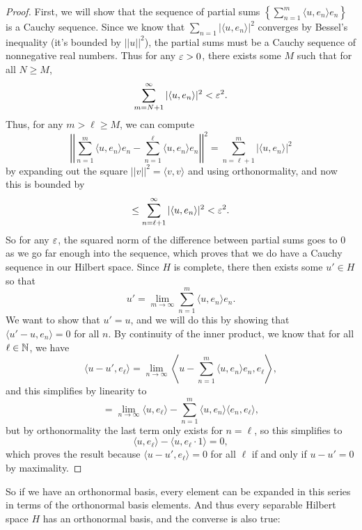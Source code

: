 \begin{proof}
First, we will show that the sequence of partial sums $\left\{\sum_{n=1}^m \langle u, e_n \rangle e_n\right\}$ is a Cauchy sequence. Since we know that $\sum_{n=1} |\langle u, e_n \rangle|^2$ converges by Bessel's inequality (it's bounded by $||u||^2$), the partial sums must be a Cauchy sequence of nonnegative real numbers. Thus for any $\varepsilon > 0$, there exists some $M$ such that for all $N \ge M$, 
\[
    \sum_{m = N+1}^{\infty} |\langle u, e_n \rangle|^2 < \varepsilon^2.
\]
Thus, for any $m > \ell \ge M$, we can compute 
\[
    \left|\left|\sum_{n=1}^m \langle u, e_n \rangle e_n - \sum_{n=1}^{\ell} \langle u, e_n \rangle e_n \right|\right|^2 = \sum_{n=\ell+1}^m |\langle u, e_n \rangle|^2
\]
by expanding out the square $||v||^2 = \langle v, v \rangle$ and using orthonormality, and now this is bounded by 
\[
    \le \sum_{n=\ell+1}^\infty |\langle u, e_n \rangle|^2 < \varepsilon^2.
\]
So for any $\varepsilon$, the squared norm of the difference between partial sums goes to $0$ as we go far enough into the sequence, which proves that we do have a Cauchy sequence in our Hilbert space. Since $H$ is complete, there then exists some $u' \in H$ so that
\[
    u' = \lim_{m \to \infty} \sum_{n=1}^m \langle u, e_n \rangle e_n.
\]
We want to show that $u' = u$, and we will do this by showing that $\langle u' - u, e_n \rangle = 0$ for all $n$. By continuity of the inner product, we know that for all $\ell \in \mathbb N$, we have
\[
    \langle u - u', e_\ell \rangle = \lim_{n \to \infty} \left\langle u - \sum_{n=1}^m \langle u, e_n \rangle e_n, e_\ell \right\rangle,
\]
and this simplifies by linearity to 
\[
    = \lim_{n \to \infty} \langle u, e_\ell \rangle - \sum_{n=1}^m \langle u, e_n \rangle \langle e_n, e_\ell \rangle,
\]
but by orthonormality the last term only exists for $n = \ell$, so this simplifies to 
\[
    \langle u, e_\ell \rangle - \langle u, e_\ell \cdot 1 \rangle = 0,
\]  
which proves the result because $\langle u - u', e_\ell \rangle = 0$ for all $\ell$ if and only if $u - u' = 0$ by maximality. 
\end{proof}

So if we have an orthonormal basis, every element can be expanded in this series in terms of the orthonormal basis elements. And thus every separable Hilbert space $H$ has an orthonormal basis, and the converse is also true:

